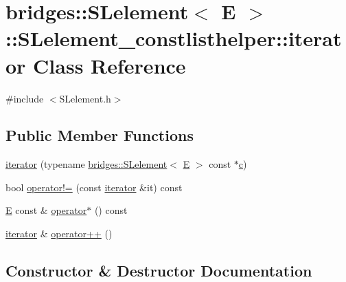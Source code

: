 \hypertarget{classbridges_1_1_s_lelement_1_1_s_lelement__constlisthelper_1_1iterator}{}\section{bridges\+:\+:S\+Lelement$<$ E $>$\+:\+:S\+Lelement\+\_\+constlisthelper\+:\+:iterator Class Reference}
\label{classbridges_1_1_s_lelement_1_1_s_lelement__constlisthelper_1_1iterator}


{\ttfamily \#include $<$S\+Lelement.\+h$>$}

\subsection*{Public Member Functions}
\begin{DoxyCompactItemize}
\item 
\hyperlink{classbridges_1_1_s_lelement_1_1_s_lelement__constlisthelper_1_1iterator_aad183529de83d5c0a911a2407a31f829}{iterator} (typename \hyperlink{classbridges_1_1_s_lelement}{bridges\+::\+S\+Lelement}$<$ \hyperlink{namespacebridges_acfb0a4f7877d8f63de3e6862004c50eda3a3ea00cfc35332cedf6e5e9a32e94da}{E} $>$ const $\ast$\hyperlink{namespacebridges_acfb0a4f7877d8f63de3e6862004c50eda4a8a08f09d37b73795649038408b5f33}{c})
\item 
bool \hyperlink{classbridges_1_1_s_lelement_1_1_s_lelement__constlisthelper_1_1iterator_ae0a1715327321142f4f56d729a615a8d}{operator!=} (const \hyperlink{classbridges_1_1_s_lelement_1_1_s_lelement__constlisthelper_1_1iterator}{iterator} \&it) const
\item 
\hyperlink{namespacebridges_acfb0a4f7877d8f63de3e6862004c50eda3a3ea00cfc35332cedf6e5e9a32e94da}{E} const  \& \hyperlink{classbridges_1_1_s_lelement_1_1_s_lelement__constlisthelper_1_1iterator_a0aaebb950a365119cdd038974d3e6bd7}{operator$\ast$} () const
\item 
\hyperlink{classbridges_1_1_s_lelement_1_1_s_lelement__constlisthelper_1_1iterator}{iterator} \& \hyperlink{classbridges_1_1_s_lelement_1_1_s_lelement__constlisthelper_1_1iterator_a1de6ed4b50ede98a435fd92ebc318cfb}{operator++} ()
\end{DoxyCompactItemize}


\subsection{Constructor \& Destructor Documentation}
\mbox{\label{classbridges_1_1_s_lelement_1_1_s_lelement__constlisthelper_1_1iterator_aad183529de83d5c0a911a2407a31f829}} 
